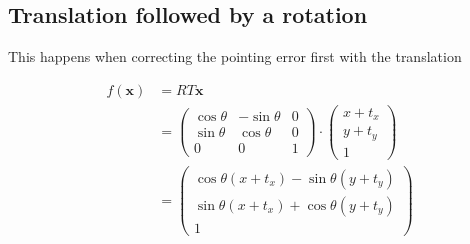 \documentclass[paper=a4, fontsize=11pt, onecolumn, tikz, dvipsnames, svgnames, x11names]{article}
\begin{document}
\subsection{Translation followed by a rotation}
This happens when correcting the pointing error first with the translation

\begin{align*}
    f(\bm{x}) &= RT\bm{x} \\
    &=
    \begin{pmatrix}
    \cos \theta & -\sin \theta & 0 \\
    \sin \theta & \cos \theta & 0 \\
    0 & 0 & 1
    \end{pmatrix}
    \cdot
    \begin{pmatrix}
    x + t_x \\
    y + t_y \\
    1
    \end{pmatrix} \\
    &=
    \begin{pmatrix}
    \cos \theta (x + t_x) - \sin \theta (y + t_y)\\
    \sin \theta (x + t_x) + \cos \theta (y + t_y)\\
    1
    \end{pmatrix}
\end{align*}




\end{document}
